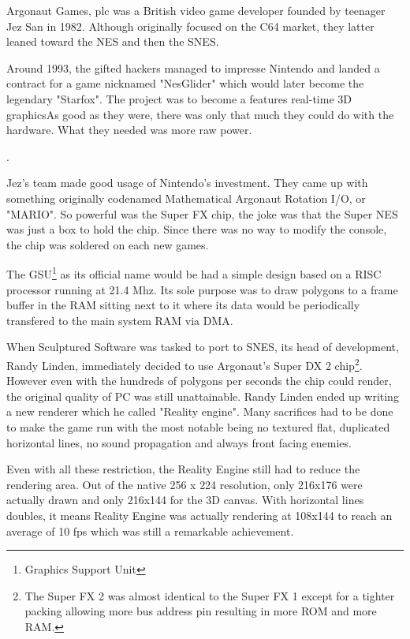 Argonaut Games, plc was a British video game developer founded by teenager Jez San in 1982. Although originally focused on the C64 market, they latter leaned toward the NES and then the SNES.\\
\par Around 1993, the gifted hackers managed to impresse Nintendo and landed a contract for a game nicknamed "NesGlider" which would later become the legendary "Starfox". The project was to become a features real-time 3D graphicsAs good as they were, there was only that much they could do with the hardware. What they needed was more raw power.\\
\par
{}.\\
\par
Jez's team made good usage of Nintendo's investment. They came up with something originally codenamed Mathematical Argonaut Rotation I/O, or "MARIO". So powerful was the Super FX chip, the joke was that the Super NES was just a box to hold the chip. Since there was no way to modify the console, the chip was soldered on each new games.\\
\par
The GSU\footnote{Graphics Support Unit} as its official name would be had a simple design based on a RISC processor running at 21.4 Mhz. Its sole purpose was to draw polygons to a frame buffer in the RAM sitting next to it where its data would be periodically transfered to the main system RAM via DMA.\\
\par
{}
\par
When Sculptured Software was tasked to port \doom to SNES, its head of development, Randy Linden, immediately decided to use Argonaut's Super DX 2 chip\footnote{The Super FX 2 was almost identical to the Super FX 1 except for a tighter packing allowing more bus address pin resulting in more ROM and more RAM.}. However even with the hundreds of polygons per seconds the chip could render, the original quality of PC \doom was still unattainable. Randy Linden ended up writing a new renderer which he called "Reality engine". Many sacrifices had to be done to make the game run with the most notable being no textured flat, duplicated horizontal lines, no sound propagation and always front facing enemies.\\
\par Even with all these restriction, the Reality Engine still had to reduce the rendering area. Out of the native 256 x 224 resolution, only 216x176 were actually drawn and only 216x144 for the 3D canvas. With horizontal lines doubles, it means Reality Engine was actually rendering at 108x144 to reach an average of 10 fps which was still a remarkable achievement.\\

